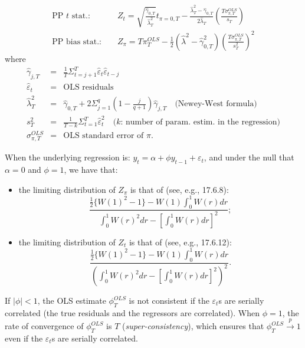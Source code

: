 \documentclass[
  12pt,
]{book}
\providecommand{\tightlist}{%
  \setlength{\itemsep}{0pt}\setlength{\parskip}{0pt}}
\theoremstyle{definition}
\theoremstyle{definition}
\theoremstyle{definition}
\theoremstyle{definition}
\theoremstyle{remark}
\begin{document}
\begin{eqnarray*}
\mbox{PP $t$ stat.: } && Z_t = \sqrt{\frac{\hat\gamma_{0,T}}{\hat\lambda_T^2}} t_{\pi=0,T} - \frac{\hat\lambda_T^2-\hat\gamma_{0,T}}{2\hat\lambda_T}\left(\frac{T\sigma^{OLS}_{\pi,T}}{s_T}\right)\\
\mbox{PP bias stat.: } && Z_\pi = T\pi^{OLS}_T - \frac{1}{2}(\hat\lambda^2-\hat\gamma_{0,T}^2)\left(\frac{T \sigma^{OLS}_{\pi,T}}{s^2_T}\right)^2
\end{eqnarray*}
where
\begin{eqnarray*}
\hat\gamma_{j,T} &=& \frac{1}{T}\Sigma_{t=j+1}^{T}\hat{\varepsilon}_t\hat{\varepsilon}_{t-j}\\
\hat{\varepsilon}_t &=& \mbox{OLS residuals}\\
\hat\lambda_T^2 &=& \hat\gamma_{0,T} + 2 \Sigma_{j=1}^{q}\left(1-\frac{j}{q+1}\right) \hat\gamma_{j,T} \quad \mbox{(Newey-West formula)}\\
s_T^2 &=& \frac{1}{T-k} \Sigma_{t=1}^{T} \hat{\varepsilon}^2_t \quad \mbox{($k$: number of param. estim. in the regression)}\\
\sigma^{OLS}_{\pi,T} &=& \mbox{OLS standard error of $\pi$}.
\end{eqnarray*}

When the underlying regression is: \(y_t = \alpha + \phi y_{t-1} + \varepsilon_t\), and under the null that \(\alpha=0\) and \(\phi=1\), we have that:

\begin{itemize}
\tightlist
\item
  the limiting distribution of \(Z_\pi\) is that of (see, e.g., \citet{Hamilton_1994} 17.6.8):
  \[
  \frac{\frac{1}{2}\{W(1)^2 - 1\} - W(1)\int_0^1 W(r)dr}{\int_0^1 W(r)^2dr-\left[\int_0^1 W(r)dr\right]^2};
  \]
\item
  the limiting distribution of \(Z_t\) is that of (see, e.g., \citet{Hamilton_1994} 17.6.12):
  \[
  \frac{\frac{1}{2}\{W(1)^2 - 1\} - W(1)\int_0^1 W(r)dr}{\left(\int_0^1 W(r)^2dr-\left[\int_0^1 W(r)dr\right]^2\right)^2}.
  \]
\end{itemize}

If \(|\phi|<1\), the OLS estimate \(\phi^{OLS}_T\) is not consistent if the \(\varepsilon_t\)s are serially correlated (the true residuals and the regressors are correlated). When \(\phi=1\), the rate of convergence of \(\phi^{OLS}_T\) is \(T\) (\emph{super-consistency}), which ensures that \(\phi^{OLS}_T \overset{p}{\rightarrow} 1\) even if the \(\varepsilon_t\)s are serially correlated.
\end{document}
